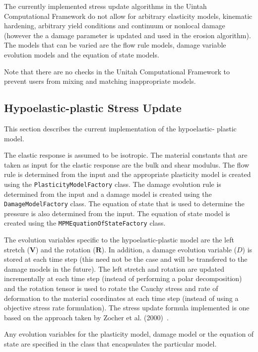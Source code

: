 The currently implemented stress update algorithms in the Uintah
Computational Framework do not allow for arbitrary elasticity models,
kinematic hardening, arbitrary yield conditions and continuum or 
nonlocal damage (however the a damage parameter is updated and 
used in the erosion algorithm).  The models that can be varied
are the flow rule models, damage variable evolution models and the
equation of state models.

Note that there are no checks in the Unitah Computational Framework
to prevent users from mixing and matching inappropriate models.

\subsection{Hypoelastic-plastic Stress Update}
This section describes the current implementation of the hypoelastic-
plastic model.

The elastic response is assumed to be isotropic.  The material
constants that are taken as input for the elastic response are the
bulk and shear modulus.  The flow rule is determined from the input
and the appropriate plasticity model is created using the 
\verb+PlasticityModelFactory+ class.  The damage evolution rule
is determined from the input and a damage model is created using
the \verb+DamageModelFactory+ class.  The equation of state 
that is used to determine the pressure is also determined from the
input.  The equation of state model is created using the 
\verb+MPMEquationOfStateFactory+ class.

The evolution variables specific to the hypoelastic-plastic model
are the left stretch ($\mathbf{V}$) and the rotation ($\mathbf{R}$).
In addition, a damage evolution variable ($D$) is stored at each time 
step (this need not be the case and will be transfered to the 
damage models in the future).  The left stretch and rotation are 
updated incrementally at each
time step (instead of performing a polar decomposition) and the 
rotation tensor is used to rotate the Cauchy stress and rate of deformation
to the material coordinates at each time step (instead of using a 
objective stress rate formulation).  The stress update formula implemented
is one based on the approach taken by  Zocher et al. (2000)~\cite{Zocher00}.  

Any evolution variables for the plasticity model, damage model or the
equation of state are specified in the class that encapsulates the 
particular model.  

